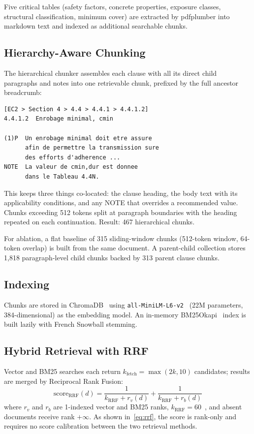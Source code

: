 \documentclass[conference]{IEEEtran}
\begin{document}
Five critical tables (safety factors, concrete properties, exposure
classes, structural classification, minimum cover) are extracted by
pdfplumber into markdown text and indexed as additional searchable
chunks.

\subsection{Hierarchy-Aware Chunking}

The hierarchical chunker assembles each clause with all its direct child
paragraphs and notes into one retrievable chunk, prefixed by the full
ancestor breadcrumb:

\begin{verbatim}
[EC2 > Section 4 > 4.4 > 4.4.1 > 4.4.1.2]
4.4.1.2  Enrobage minimal, cmin

(1)P  Un enrobage minimal doit etre assure
      afin de permettre la transmission sure
      des efforts d'adherence ...
NOTE  La valeur de cmin,dur est donnee
      dans le Tableau 4.4N.
\end{verbatim}

This keeps three things co-located: the clause heading, the body text
with its applicability conditions, and any NOTE that overrides a
recommended value.
Chunks exceeding 512 tokens split at paragraph boundaries with the
heading repeated on each continuation.
Result: 467 hierarchical chunks.

For ablation, a flat baseline of 315 sliding-window chunks (512-token
window, 64-token overlap) is built from the same document.
A parent-child collection stores 1{,}818 paragraph-level child chunks
backed by 313 parent clause chunks.

\subsection{Indexing}

Chunks are stored in ChromaDB~\cite{chroma2023} using
\texttt{all-MiniLM-L6-v2}~\cite{reimers2019sbert} (22M parameters,
384-dimensional) as the embedding model.
An in-memory BM25Okapi~\cite{robertson2009bm25} index is built lazily
with French Snowball stemming.

\subsection{Hybrid Retrieval with RRF}

Vector and BM25 searches each return $k_{\text{fetch}} = \max(2k, 10)$
candidates; results are merged by Reciprocal Rank Fusion:
\begin{equation}
  \mathrm{score}_{\mathrm{RRF}}(d)
    = \frac{1}{k_{\mathrm{RRF}} + r_v(d)}
    + \frac{1}{k_{\mathrm{RRF}} + r_b(d)}
  \label{eq:rrf}
\end{equation}
where $r_v$ and $r_b$ are 1-indexed vector and BM25 ranks,
$k_{\mathrm{RRF}} = 60$~\cite{cormack2009rrf}, and absent documents
receive rank $+\infty$.
As shown in~\eqref{eq:rrf}, the score is rank-only and requires no
score calibration between the two retrieval methods.
\end{document}
